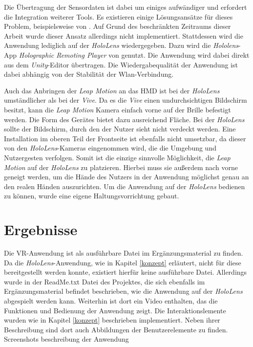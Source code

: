 Die Übertragung der Sensordaten ist dabei um einiges aufwändiger und erfordert die Integration weiterer Tools. Es existieren einige Lösungsansätze für dieses Problem, beispielsweise von \cite{hololensGithub}. Auf Grund des beschränkten Zeitraums dieser Arbeit wurde dieser Ansatz allerdings nicht implementiert.
Stattdessen wird die Anwendung lediglich auf der \textit{HoloLens} wiedergegeben. Dazu wird die \textit{Hololens}-App \textit{Holographic Remoting Player} von \cite{remoteApp} genutzt. Die Anwendung wird dabei direkt aus dem \textit{Unity}-Editor übertragen.
Die Wiedergabequalität der Anwendung ist dabei abhängig von der Stabilität der Wlan-Verbindung.

Auch das Anbringen der \textit{Leap Motion} an das HMD ist bei der \textit{HoloLens} umständlicher als bei der \textit{Vive}. 
Da es die \textit{Vive} einen undurchsichtigen Bildschirm besitzt, kann die \textit{Leap Motion} Kamera einfach vorne auf der Brille befestigt werden. Die Form des Gerätes bietet dazu ausreichend Fläche.
Bei der \textit{HoloLens} sollte der Bildschirm, durch den der Nutzer sieht nicht verdeckt werden. Eine Installation im oberen Teil der Frontseite ist ebenfalls nicht umsetzbar, da dieser von den \textit{HoloLens}-Kameras eingenommen wird, die die Umgebung und Nutzergesten verfolgen.
Somit ist die einzige sinnvolle Möglichkeit, die \textit{Leap Motion} auf der \textit{HoloLens} zu platzieren. Hierbei muss sie außerdem nach vorne geneigt werden, um die Hände des Nutzers in der Anwendung möglichst genau an den realen Händen auszurichten. 
Um die Anwendung auf der \textit{HoloLens} bedienen zu können, wurde eine eigene Haltungsvorrichtung gebaut.



\section{Ergebnisse}
\label{ergebnisse}

Die VR-Anwendung ist als ausführbare Datei im Ergänzungsmaterial zu finden. Da die \textit{HoloLens}-Anwendung, wie in Kapitel \ref{konzept} erläutert, nicht für diese bereitgestellt werden konnte, existiert hierfür keine ausführbare Datei. Allerdings wurde in der ReadMe.txt Datei des Projektes, die sich ebenfalls im Ergänzungsmaterial befindet beschrieben, wie die Anwendung auf der \textit{HoloLens} abgespielt werden kann. 
Weiterhin ist dort ein Video enthalten, das die Funktionen und Bedienung der Anwendung zeigt.
Die Interaktionslemente wurden wie in Kapitel \ref{konzept} beschrieben implementiert. Neben ihrer Beschreibung sind dort auch Abbildungen der Benutzerelemente zu finden. 
Screenshots
beschreibung der Anwendung

